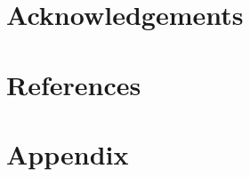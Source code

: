 \documentclass{article}
\begin{document}
\section{Acknowledgements}

\section*{References}

\section*{Appendix}
\end{document}
